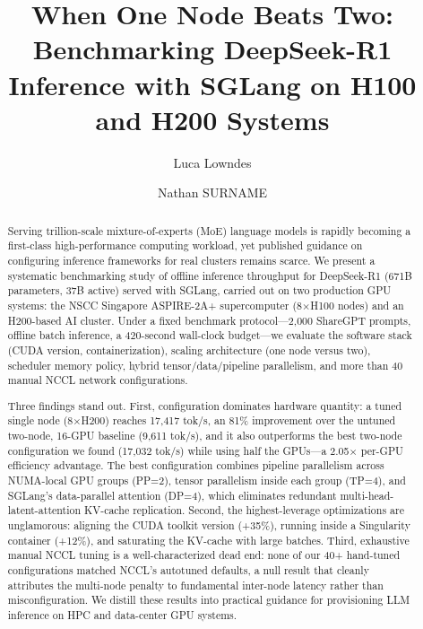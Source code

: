 \documentclass[sigconf]{acmart}
\begin{document}
\title[When One Node Beats Two]{When One Node Beats Two: Benchmarking DeepSeek-R1 Inference with SGLang on H100 and H200 Systems}

\author{Luca Lowndes}

\author{Nathan SURNAME}

\begin{abstract}
Serving trillion-scale mixture-of-experts (MoE) language models is rapidly becoming a first-class high-performance computing workload, yet published guidance on configuring inference frameworks for real clusters remains scarce. We present a systematic benchmarking study of offline inference throughput for DeepSeek-R1 (671B parameters, 37B active) served with SGLang, carried out on two production GPU systems: the NSCC Singapore ASPIRE-2A+ supercomputer (8$\times$H100 nodes) and an H200-based AI cluster. Under a fixed benchmark protocol---2{,}000 ShareGPT prompts, offline batch inference, a 420-second wall-clock budget---we evaluate the software stack (CUDA version, containerization), scaling architecture (one node versus two), scheduler memory policy, hybrid tensor/data/pipeline parallelism, and more than 40 manual NCCL network configurations.

Three findings stand out. First, configuration dominates hardware quantity: a tuned single node (8$\times$H200) reaches 17{,}417 tok/s, an 81\% improvement over the untuned two-node, 16-GPU baseline (9{,}611 tok/s), and it also outperforms the best two-node configuration we found (17{,}032 tok/s) while using half the GPUs---a 2.05$\times$ per-GPU efficiency advantage. The best configuration combines pipeline parallelism across NUMA-local GPU groups (PP=2), tensor parallelism inside each group (TP=4), and SGLang's data-parallel attention (DP=4), which eliminates redundant multi-head-latent-attention KV-cache replication. Second, the highest-leverage optimizations are unglamorous: aligning the CUDA toolkit version (+35\%), running inside a Singularity container (+12\%), and saturating the KV-cache with large batches. Third, exhaustive manual NCCL tuning is a well-characterized dead end: none of our 40+ hand-tuned configurations matched NCCL's autotuned defaults, a null result that cleanly attributes the multi-node penalty to fundamental inter-node latency rather than misconfiguration. We distill these results into practical guidance for provisioning LLM inference on HPC and data-center GPU systems.
\end{abstract}
\end{document}

